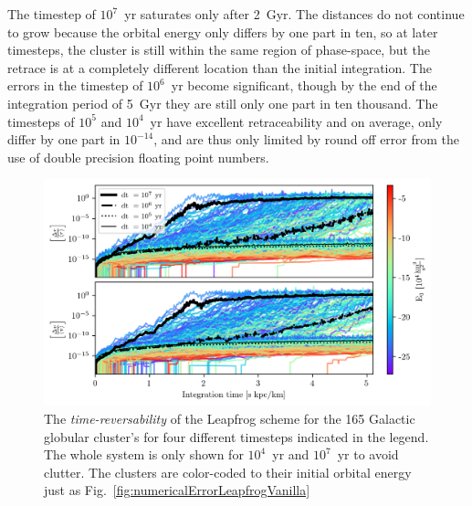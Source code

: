         The timestep of $10^7$~yr saturates only after 2~Gyr. The distances do not continue to grow because the orbital energy only differs by one part in ten, so at later timesteps, the cluster is still within the same region of phase-space, but the retrace is at a completely different location than the initial integration. The errors in the timestep of $10^6$~yr become significant, though by the end of the integration period of 5~Gyr they are still only one part in ten thousand. The timesteps of $10^5$ and $10^4$~yr have excellent retraceability and on average, only differ by one part in $10^{-14}$, and are thus only limited by round off error from the use of double precision floating point numbers.
        \begin{figure}
            \centering
            \includegraphics[width=\linewidth]{images/numericalErrorReverseIntegration.png}
            \caption[Time-reversability of the globular cluster system]{The \textit{time-reversability} of the Leapfrog scheme for the 165 Galactic globular cluster's for four different timesteps indicated in the legend. The whole system is only shown for $10^4$~yr and $10^7$~yr to avoid clutter. The clusters are color-coded to their initial orbital energy just as Fig.~\ref{fig:numericalErrorLeapfrogVanilla}}
            \label{fig:numericalErrorReverseIntegration}
        \end{figure}

